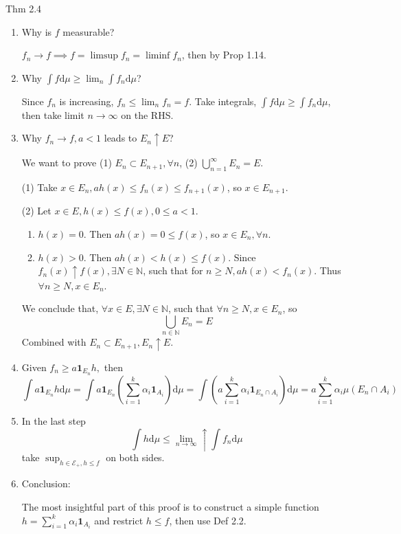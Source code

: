 \begin{note}{Thm 2.4}
    \begin{enumerate}
        \item Why is $f$ measurable? 
        
        $f_n\to f\implies f=\limsup f_n=\liminf f_n$, then by Prop 1.14.
        \item Why $\int f \mathrm{d}\mu\ge \lim_n \int f_n \mathrm{d}\mu$? 
        
        Since $f_n$ is increasing, $f_n\le \lim_n f_n=f$. Take integrals, $\int f \mathrm{d}\mu\ge \int f_n \mathrm{d}\mu$, then take limit $n\to\infty$ on the RHS.
        \item Why $f_n\to f,a<1$ leads to $E_n\uparrow E$?

        We want to prove (1) $E_n\subset E_{n+1},\forall n$, (2) $\bigcup_{n=1}^{\infty}E_n=E$.

        (1) Take $x\in E_n, ah(x)\le f_n(x)\le f_{n+1}(x)$, so $x\in E_{n+1}$.

        (2) Let $x\in E,h(x)\le f(x),0\le a<1$. 
        \begin{enumerate}
            \item $h(x)=0$. Then $ah(x)=0\le f(x)$, so $x\in E_n,\forall n$.
            \item $h(x)>0$. Then $ah(x)<h(x)\le f(x)$. Since $f_n(x)\uparrow f(x), \exists N\in \mathbb{N}$, such that for $n\ge N,ah(x)<f_n(x)$. Thus $\forall n\ge N, x\in E_n$.
        \end{enumerate}
        We conclude that, $\forall x\in E,\exists N\in\mathbb{N}$, such that $\forall n\ge N,x\in E_n$, so
        \[\bigcup_{n\in\mathbb{N}}E_n=E\]
        Combined with $E_n\subset E_{n+1}, E_n\uparrow E$.
        \item Given $f_n\ge a\mathbf{1}_{E_n}h,$ then
        \[
        \int a\mathbf{1}_{E_n}h\mathrm{d}\mu=\int a\mathbf{1}_{E_n}\left(\sum_{i=1}^k \alpha_i \mathbf{1}_{A_i}\right)\mathrm{d}\mu=\int \left(a\sum_{i=1}^k \alpha_i \mathbf{1}_{E_n\cap A_i}\right)\mathrm{d}\mu=a\sum_{i=1}^k \alpha_i\mu(E_n\cap A_i)
        \]
        \item In the last step 
        \[
        \int h\mathrm{d}\mu\le \lim_{n\to\infty}\uparrow \int f_n \mathrm{d}\mu
        \]
        take $\sup_{h\in \mathcal{E}_+,h\le f}$ on both sides.
        \item Conclusion: 
        
        The most insightful part of this proof is to construct a simple function $h=\sum_{i=1}^k \alpha_i \mathbf{1}_{A_i}$ and restrict $h\le f$, then use Def 2.2.
    \end{enumerate}
\end{note}

